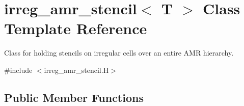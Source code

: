 \hypertarget{classirreg__amr__stencil}{}\section{irreg\+\_\+amr\+\_\+stencil$<$ T $>$ Class Template Reference}
\label{classirreg__amr__stencil}


Class for holding stencils on irregular cells over an entire A\+MR hierarchy.  




{\ttfamily \#include $<$irreg\+\_\+amr\+\_\+stencil.\+H$>$}

\subsection*{Public Member Functions}
